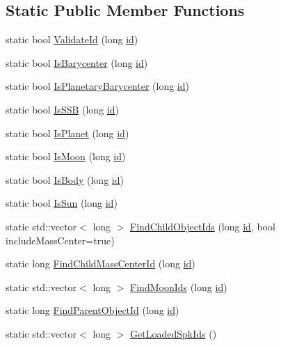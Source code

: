 \subsection*{Static Public Member Functions}
\begin{DoxyCompactItemize}
\item 
static bool \hyperlink{class_space_object_afa92ccf71440611067a3ee0239c060ae}{Validate\+Id} (long \hyperlink{glext_8h_a58c2a664503e14ffb8f21012aabff3e9}{id})
\item 
static bool \hyperlink{class_space_object_a38d4f7ff4f44e7f0319710984959caa8}{Is\+Barycenter} (long \hyperlink{glext_8h_a58c2a664503e14ffb8f21012aabff3e9}{id})
\item 
static bool \hyperlink{class_space_object_a2e9ae0efc7ca822951d5ae6c394a6441}{Is\+Planetary\+Barycenter} (long \hyperlink{glext_8h_a58c2a664503e14ffb8f21012aabff3e9}{id})
\item 
static bool \hyperlink{class_space_object_aa8e64576eba8b2d071ab5dd57757abf1}{Is\+S\+S\+B} (long \hyperlink{glext_8h_a58c2a664503e14ffb8f21012aabff3e9}{id})
\item 
static bool \hyperlink{class_space_object_a1bf248222724bd97a4cbf7a7a82a924b}{Is\+Planet} (long \hyperlink{glext_8h_a58c2a664503e14ffb8f21012aabff3e9}{id})
\item 
static bool \hyperlink{class_space_object_ac96340e8808d4dd6482190df656275e4}{Is\+Moon} (long \hyperlink{glext_8h_a58c2a664503e14ffb8f21012aabff3e9}{id})
\item 
static bool \hyperlink{class_space_object_acc1ec4ac4e9cf062695654172c7c143b}{Is\+Body} (long \hyperlink{glext_8h_a58c2a664503e14ffb8f21012aabff3e9}{id})
\item 
static bool \hyperlink{class_space_object_a3dc214dd3f78bd07778ee6a899812ee6}{Is\+Sun} (long \hyperlink{glext_8h_a58c2a664503e14ffb8f21012aabff3e9}{id})
\item 
static std\+::vector$<$ long $>$ \hyperlink{class_space_object_ae7c1493eccfe0e35037e884bc886d164}{Find\+Child\+Object\+Ids} (long \hyperlink{glext_8h_a58c2a664503e14ffb8f21012aabff3e9}{id}, bool include\+Mass\+Center=true)
\item 
static long \hyperlink{class_space_object_a980fbd5fe060a425fd0dbaac37879eb0}{Find\+Child\+Mass\+Center\+Id} (long \hyperlink{glext_8h_a58c2a664503e14ffb8f21012aabff3e9}{id})
\item 
static std\+::vector$<$ long $>$ \hyperlink{class_space_object_a88fb61e9a9c94f262cad1e5fed33e73b}{Find\+Moon\+Ids} (long \hyperlink{glext_8h_a58c2a664503e14ffb8f21012aabff3e9}{id})
\item 
static long \hyperlink{class_space_object_a6d9980e2b888bcd13cb393c6cf58e499}{Find\+Parent\+Object\+Id} (long \hyperlink{glext_8h_a58c2a664503e14ffb8f21012aabff3e9}{id})
\item 
static std\+::vector$<$ long $>$ \hyperlink{class_space_object_a71e5c1b80aa1a2f512bdbdd0ee186c4d}{Get\+Loaded\+Spk\+Ids} ()
\end{DoxyCompactItemize}
